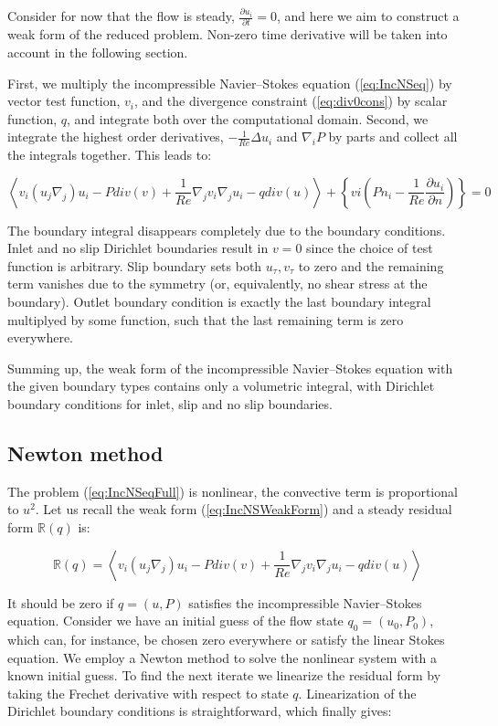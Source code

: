 Consider for now that the flow is steady, $\frac{\partial u_i}{\partial t} = 0$, and here we aim to construct a weak form of the reduced problem. Non-zero time derivative will be taken into account in the following section. 

First, we multiply the incompressible Navier--Stokes equation (\ref{eq:IncNSeq}) by vector test function, $v_i$, and the divergence constraint (\ref{eq:div0cons}) by scalar function, $q$, and integrate both over the computational domain. Second, we integrate the highest order derivatives, $-\frac{1}{Re}\Delta u_i$ and $\nabla_i P$ by parts and collect all the integrals together. This leads to:

\begin{equation}
\label{eq:IncNSWeakForm}
\left<v_i (u_j \nabla_j) u_i - P div(v) + \frac{1}{Re}\nabla_j v_i \nabla_j u_i - q div(u)\right> + \left\{ vi \left( P n_i - \frac{1}{Re} \frac{\partial u_i}{\partial n} \right) \right\} = 0
\end{equation}

The boundary integral disappears completely due to the boundary conditions. Inlet and no slip Dirichlet boundaries result in $v = 0$ since the choice of test function is arbitrary. Slip boundary sets both $u_{\tau}, v_{\tau}$ to zero and the remaining term vanishes due to the symmetry (or, equivalently, no shear stress at the boundary). Outlet boundary condition is exactly the last boundary integral multiplyed by some function, such that the last remaining term is zero everywhere.

Summing up, the weak form of the incompressible Navier--Stokes equation with the given boundary types contains only a volumetric integral, with Dirichlet boundary conditions for inlet, slip and no slip boundaries.

\subsection{Newton method}

The problem (\ref{eq:IncNSeqFull}) is nonlinear, the convective term is proportional to $u^2$. Let us recall the weak form (\ref{eq:IncNSWeakForm}) and a steady residual form $\mathbb{R}(q)$ is:

\begin{equation}
\mathbb{R}(q) = \left<v_i (u_j \nabla_j) u_i - P div(v) + \frac{1}{Re}\nabla_j v_i \nabla_j u_i - q div(u)\right>
\end{equation}

It should be zero if $q = (u,P)$ satisfies the incompressible Navier--Stokes equation. Consider we have an initial guess of the flow state $q_0 = (u_0, P_0)$, which can, for instance, be chosen zero everywhere or satisfy the linear Stokes equation. We employ a Newton method to solve the nonlinear system with a known initial guess. To find the next iterate we linearize the residual form by taking the Frechet derivative with respect to state $q$. Linearization of the Dirichlet boundary conditions is straightforward, which finally gives:

